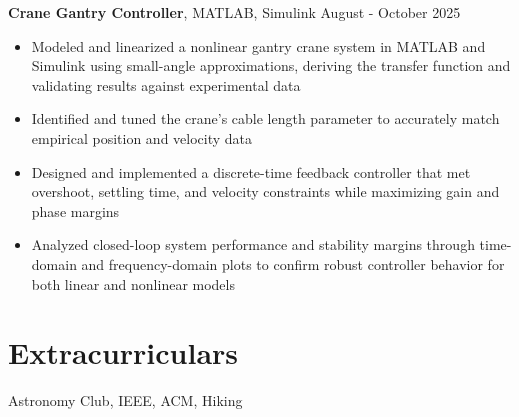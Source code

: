 \documentclass[11pt]{article}
\begin{document}
\textbf{Crane Gantry Controller}, MATLAB, Simulink  \hfill August - October 2025
\begin{itemize}
  \item Modeled and linearized a nonlinear gantry crane system in MATLAB and Simulink using small-angle approximations, deriving the transfer function and validating results against experimental data
  \item Identified and tuned the crane's cable length parameter to accurately match empirical position and velocity data
  \item Designed and implemented a discrete-time feedback controller that met overshoot, settling time, and velocity constraints while maximizing gain and phase margins
  \item Analyzed closed-loop system performance and stability margins through time-domain and frequency-domain plots to confirm robust controller behavior for both linear and nonlinear models
\end{itemize}

\section*{Extracurriculars}
\small Astronomy Club, IEEE, ACM, Hiking
\end{document}
